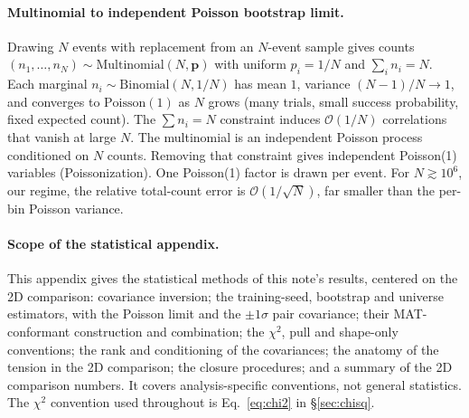 \paragraph{Multinomial to independent Poisson bootstrap limit.} Drawing $N$ events with replacement from an $N$-event sample gives counts $(n_{1},\dots,n_{N}) \sim \mathrm{Multinomial}(N,\mathbf{p})$ with uniform $p_{i}=1/N$ and $\sum_{i}n_{i}=N$. Each marginal $n_{i}\sim\mathrm{Binomial}(N,1/N)$ has mean $1$, variance $(N-1)/N \to 1$, and converges to $\mathrm{Poisson}(1)$ as $N$ grows (many trials, small success probability, fixed expected count). The $\sum n_{i}=N$ constraint induces $\mathcal{O}(1/N)$ correlations that vanish at large $N$. The multinomial is an independent Poisson process conditioned on $N$ counts. Removing that constraint gives independent Poisson(1) variables (Poissonization). One Poisson(1) factor is drawn per event. For $N \gtrsim 10^{6}$, our regime, the relative total-count error is $\mathcal{O}(1/\sqrt{N})$, far smaller than the per-bin Poisson variance.

\paragraph{Scope of the statistical appendix.} This appendix gives the statistical methods of this note's results, centered on the 2D comparison: covariance inversion; the training-seed, bootstrap and universe estimators, with the Poisson limit and the $\pm1\sigma$ pair covariance; their MAT-conformant construction and combination; the $\chi^{2}$, pull and shape-only conventions; the rank and conditioning of the covariances; the anatomy of the tension in the 2D comparison; the closure procedures; and a summary of the 2D comparison numbers. It covers analysis-specific conventions, not general statistics. The $\chi^{2}$ convention used throughout is Eq.~\eqref{eq:chi2} in \S\ref{sec:chisq}.

